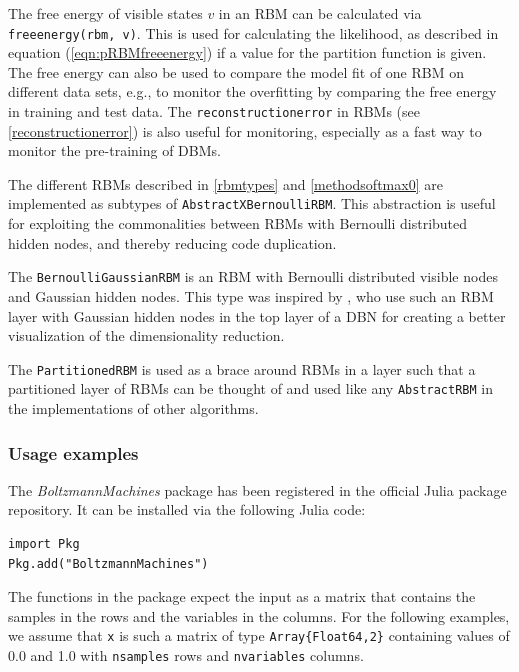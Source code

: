 \documentclass[12pt]{article}
\newcommand{\inlinecode}[1]{\texttt{#1}}
\newcommand{\apkg}[1]{\emph{#1}}
\begin{document}
The free energy of visible states $v$ in an RBM can be calculated via  \inlinecode{freeenergy(rbm, v)}.
This is used for calculating the likelihood, as described in equation (\ref{eqn:pRBMfreeenergy}) if a value for the partition function is given.
The free energy can also be used to compare the model fit of one RBM on different data sets, e.g., to monitor the overfitting by comparing the free energy in training and test data.
The \inlinecode{reconstructionerror} in RBMs (see \ref{reconstructionerror}) is also useful for monitoring, especially as a fast way to monitor the pre-training of DBMs.

The different RBMs described in \ref{rbmtypes} and \ref{methodsoftmax0} are implemented as subtypes of \inlinecode{AbstractXBernoulliRBM}.
This abstraction is useful for exploiting the commonalities between RBMs with Bernoulli distributed hidden nodes, and thereby reducing code duplication.

The \inlinecode{BernoulliGaussianRBM} is an RBM with Bernoulli distributed visible nodes and Gaussian hidden nodes.
This type was inspired by \cite{hinton_reducing_2006}, who use such an RBM layer with Gaussian hidden nodes in the top layer of a DBN for creating a better visualization of the dimensionality reduction.

The \inlinecode{PartitionedRBM} is used as a brace around RBMs in a layer such that a partitioned layer of RBMs can be thought of and used like any \inlinecode{AbstractRBM} in the implementations of other algorithms.



\subsubsection{Usage examples}
The \apkg{BoltzmannMachines} package has been registered in the official Julia package repository. It can be installed via the following Julia code:

\begin{lstlisting}
import Pkg
Pkg.add("BoltzmannMachines")
\end{lstlisting}

The functions in the package expect the input as a matrix that contains the samples in the rows and the variables in the columns.
For the following examples, we assume that \inlinecode{x} is such a matrix of type \inlinecode{Array\{Float64,2\}} containing values of 0.0 and 1.0 with \inlinecode{nsamples} rows and \inlinecode{nvariables} columns.
\end{document}
